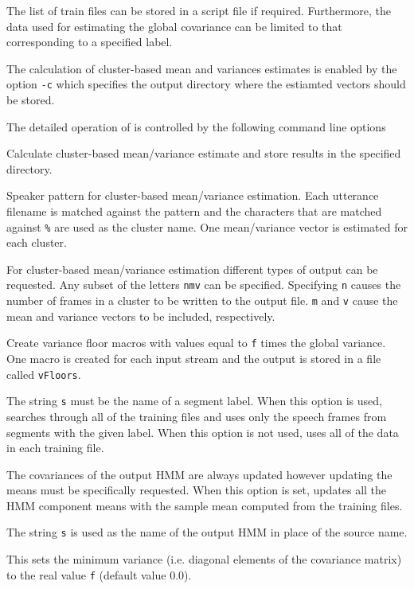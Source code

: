 The list of train files can be stored in a script file if required.
Furthermore, the data used for estimating the global
covariance can be limited to that corresponding to a specified label.


The calculation of cluster-based mean and variances estimates is
enabled by the option \texttt{-c} which specifies the output directory
where the estiamted vectors should be stored.

The detailed operation of  is controlled by the following
command line options
\begin{optlist}
   Calculate cluster-based mean/variance estimate and
  store results in the specified directory.

   Speaker pattern for cluster-based mean/variance
  estimation. Each utterance filename is matched against the pattern
  and the characters that are matched against \verb|%| are used as the
  cluster name. One mean/variance vector is estimated for each
  cluster.
  
   For cluster-based mean/variance estimation different
  types of output can be requested. Any subset of the letters
  \texttt{nmv} can be specified. Specifying \texttt{n} causes the
  number of frames in a cluster to be written to the output file.
  \texttt{m} and \texttt{v} cause the mean and variance vectors to be
  included, respectively.

   Create variance floor macros with values equal to 
     \texttt{f} times the global variance.  One macro is created for
     each input stream and the output is stored in a file 
     called \texttt{vFloors}. 

   The string {\tt s} must be the name of a
      segment label.  When this option is used,  searches
      through all of the training files and uses only the speech
      frames from segments with the given label.  When this option is not 
      used,  uses
      all of the data in each training file.

   The covariances of the output HMM are always updated
    however updating the means must be specifically requested. When 
    this option is set,  updates all the HMM component 
    means with the sample mean computed from the training files. 

    The string {\tt s} is used as the name of the output
      HMM in place of the source name.

    This sets the minimum variance (i.e. diagonal elements of
      the covariance matrix) to the real value {\tt f} (default value
      0.0).

\stdoptB
\stdoptF
\stdoptG
\stdoptH
\stdoptI
\stdoptL
\stdoptM
\stdoptX

\end{optlist}

